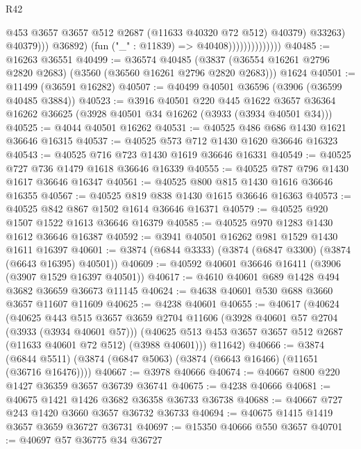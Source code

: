 \begin{lexlean}{R42}
\begin{coremodule}
                                          @453
                                          @3657
                                          @3657
                                          @512
                                          @2687
                                          (@11633 @40320 @72 @512)
                                          @40379)
                                        @33263)
                                      @40379)))
                                @36892)
                              (fun ("_" : @11839) => @40408))))))))))))))
@40485 := @16263 @36551
@40499 := @36574
    @40485
    (@3837 (@36554 @16261 @2796 @2820 @2683) (@3560 (@36560 @16261 @2796 @2820 @2683)))
    @1624
@40501 := @11499 (@36591 @16282)
@40507 := @40499 @40501 @36596 (@3906 (@36599 @40485 @3884))
@40523 := @3916
    @40501
    @220
    @445
    @1622
    @3657
    @36364
    @16262
    @36625
    (@3928 @40501 @34 @16262 (@3933 (@3934 @40501 @34)))
@40525 := @4044 @40501 @16262
@40531 := @40525 @486 @686 @1430 @1621 @36646 @16315
@40537 := @40525 @573 @712 @1430 @1620 @36646 @16323
@40543 := @40525 @716 @723 @1430 @1619 @36646 @16331
@40549 := @40525 @727 @736 @1479 @1618 @36646 @16339
@40555 := @40525 @787 @796 @1430 @1617 @36646 @16347
@40561 := @40525 @800 @815 @1430 @1616 @36646 @16355
@40567 := @40525 @819 @838 @1430 @1615 @36646 @16363
@40573 := @40525 @842 @867 @1502 @1614 @36646 @16371
@40579 := @40525 @920 @1507 @1522 @1613 @36646 @16379
@40585 := @40525 @970 @1283 @1430 @1612 @36646 @16387
@40592 := @3941 @40501 @16262 @981 @1529 @1430 @1611 @16397
@40601 := @3874 (@6844 @3333) (@3874 (@6847 @3300) (@3874 (@6643 @16395) @40501))
@40609 := @40592 @40601 @36646 @16411 (@3906 (@3907 @1529 @16397 @40501))
@40617 := @4610 @40601 @689 @1428 @494 @3682 @36659 @36673 @11145
@40624 := @4638 @40601 @530 @688 @3660 @3657 @11607 @11609
@40625 := @4238 @40601
@40655 := @40617
    (@40624
      (@40625
        @443
        @515
        @3657
        @3659
        @2704
        @11606
        (@3928 @40601 @57 @2704 (@3933 (@3934 @40601 @57)))
        (@40625 @513 @453 @3657 @3657 @512 @2687 (@11633 @40601 @72 @512) (@3988 @40601)))
      @11642)
@40666 := @3874 (@6844 @5511) (@3874 (@6847 @5063) (@3874 (@6643 @16466) (@11651 (@36716 @16476))))
@40667 := @3978 @40666
@40674 := @40667 @800 @220 @1427 @36359 @3657 @36739 @36741
@40675 := @4238 @40666
@40681 := @40675 @1421 @1426 @3682 @36358 @36733 @36738
@40688 := @40667 @727 @243 @1420 @3660 @3657 @36732 @36733
@40694 := @40675 @1415 @1419 @3657 @3659 @36727 @36731
@40697 := @15350 @40666 @550 @3657
@40701 := @40697 @57 @36775 @34 @36727

\end{coremodule}
\end{lexlean}
